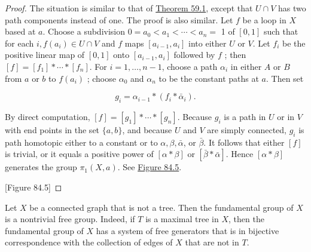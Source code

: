 \begin{proof}
	The situation is similar to that of \hyperref[thm:59.1]{Theorem 59.1}, except that \(U \cap V\) has two path components instead of one. The proof is also similar.
Let \(f\) be a loop in \(X\) based at \(a\). Choose a subdivision \(0 = a_{0} < a_{1} < \cdots < a_{n} =\) 1 of \([ {0,1}]\) such that for each \(i,f( a_{i}) \in U \cap V\) and \(f\) maps \([ {a_{i - 1},a_{i}}]\) into either \(U\) or \(V\). Let \(f_{i}\) be the positive linear map of \([ {0,1}]\) onto \([ {a_{i - 1},a_{i}}]\) followed by \(f\) ; then \([ f] = [ f_{1}] * \cdots * [ f_{n}]\). For \(i = 1,\ldots, n - 1\), choose a path \({\alpha }_{i}\) in either \(A\) or \(B\) from \(a\) or \(b\) to \(f( a_{i})\) ; choose \({\alpha }_{0}\) and \({\alpha }_{n}\) to be the constant paths at \(a\). Then set

\[
g_{i} = {\alpha }_{i - 1} * ( {f_{i} * \bar{\alpha }_{i}}).
\]

By direct computation, \([ f] = [ g_{1}] * \cdots * [ g_{n}]\). Because \(g_{i}\) is a path in \(U\) or in \(V\) with end points in the set \(\{ a,b\}\), and because \(U\) and \(V\) are simply connected, \(g_{i}\) is path homotopic either to a constant or to \(\alpha ,\beta ,\bar{\alpha }\), or \(\bar{\beta }\). It follows that either \([ f]\) is trivial, or it equals a positive power of \([ {\alpha * \beta }]\) or \([ {\bar{\beta } * \bar{\alpha }}]\). Hence \([ {\alpha * \beta }]\) generates the group \({\pi }_{1}( {X,a})\). See \hyperref[fig:84.5]{Figure 84.5}.

[Figure 84.5]
\end{proof}
\begin{theorem}
\label{thm:\thetheorem}
	Let \(X\) be a connected graph that is not a tree. Then the fundamental group of \(X\) is a nontrivial free group. Indeed, if \(T\) is a maximal tree in \(X\), then the fundamental group of \(X\) has a system of free generators that is in bijective correspondence with the collection of edges of \(X\) that are not in \(T\).
\end{theorem}

